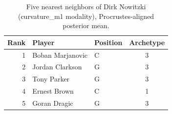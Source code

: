 \begin{table}[htbp]
  \centering\small
  \begin{tabular}{rllc}
    \toprule
    Rank & Player & Position & Archetype \\
    \midrule
    1 & Boban Marjanovic & C & 3 \\
    2 & Jordan Clarkson & G & 3 \\
    3 & Tony Parker & G & 3 \\
    4 & Ernest Brown & C & 1 \\
    5 & Goran Dragic & G & 3 \\
    \bottomrule
  \end{tabular}
  \caption{Five nearest neighbors of Dirk Nowitzki (curvature_m1 modality), Procrustes-aligned posterior mean.}
  \label{tab:Dirk_Nowitzki_neighbors_curvature_m1}
\end{table}

